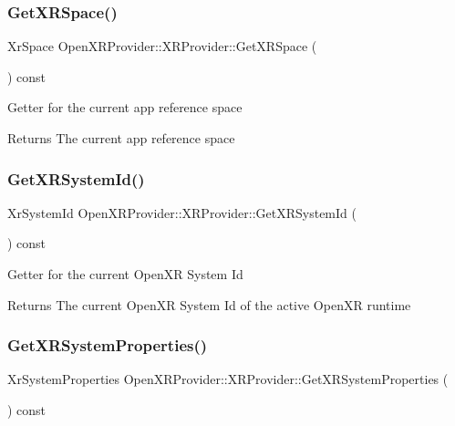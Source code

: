 \subsubsection{\texorpdfstring{GetXRSpace()}{GetXRSpace()}}
{\footnotesize\ttfamily Xr\+Space Open\+X\+R\+Provider\+::\+X\+R\+Provider\+::\+Get\+X\+R\+Space (\begin{DoxyParamCaption}{ }\end{DoxyParamCaption}) const\hspace{0.3cm}{\ttfamily [inline]}}

Getter for the current app reference space \begin{DoxyReturn}{Returns}
The current app reference space 
\end{DoxyReturn}
\mbox{\label{class_open_x_r_provider_1_1_x_r_provider_a8b2a2dd1e3497a8395b496be5eff6f2c}} 
\subsubsection{\texorpdfstring{GetXRSystemId()}{GetXRSystemId()}}
{\footnotesize\ttfamily Xr\+System\+Id Open\+X\+R\+Provider\+::\+X\+R\+Provider\+::\+Get\+X\+R\+System\+Id (\begin{DoxyParamCaption}{ }\end{DoxyParamCaption}) const\hspace{0.3cm}{\ttfamily [inline]}}

Getter for the current Open\+XR System Id \begin{DoxyReturn}{Returns}
The current Open\+XR System Id of the active Open\+XR runtime 
\end{DoxyReturn}
\mbox{\label{class_open_x_r_provider_1_1_x_r_provider_a6a1d17df601888feeb5481fc1d49bae2}} 
\subsubsection{\texorpdfstring{GetXRSystemProperties()}{GetXRSystemProperties()}}
{\footnotesize\ttfamily Xr\+System\+Properties Open\+X\+R\+Provider\+::\+X\+R\+Provider\+::\+Get\+X\+R\+System\+Properties (\begin{DoxyParamCaption}{ }\end{DoxyParamCaption}) const\hspace{0.3cm}{\ttfamily [inline]}}


